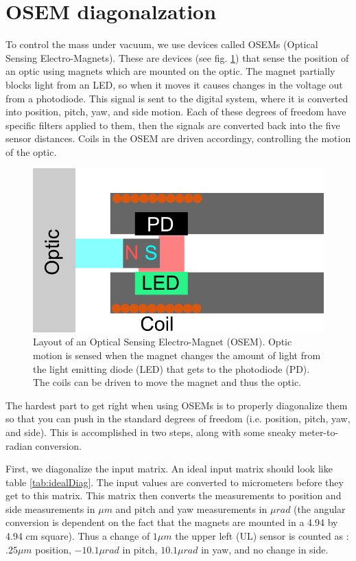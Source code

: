 \section{OSEM diagonalzation}

To control the mass under vacuum, we use devices called OSEMs (Optical Sensing Electro-Magnets). These are devices (see fig. \ref{fig:osem}) that sense the position of an optic using magnets which are mounted on the optic. The magnet partially blocks light from an LED, so when it moves it causes changes in the voltage out from a photodiode. This signal is sent to the digital system, where it is converted into position, pitch, yaw, and side motion. Each of these degrees of freedom have specific filters applied to them, then the signals are converted back into the five sensor distances. Coils in the OSEM are driven accordingy, controlling the motion of the optic.

\begin{figure}[hp]
	\centering
		\includegraphics[width=.5\textwidth]{figures/suspensions/OSEM.png}
	\caption[OSEM diagram]{Layout of an Optical Sensing Electro-Magnet (OSEM). Optic motion is sensed when the magnet changes the amount of light from the light emitting diode (LED) that gets to the photodiode (PD). The coils can be driven to move the magnet and thus the optic.}
	\label{fig:osem}
\end{figure}

The hardest part to get right when using OSEMs is to properly diagonalize them so that you can push in the standard degrees of freedom (i.e. position, pitch, yaw, and side). This is accomplished in two steps, along with some sneaky meter-to-radian conversion. 

First, we diagonalize the input matrix. An ideal input matrix should look like table \ref{tab:idealDiag}. The input values are converted to micrometers before they get to this matrix. This matrix then converts the measurements to position and side measurements in $\mu m$ and pitch and yaw measurements in $\mu rad$ (the angular conversion is dependent on the fact that the magnets are mounted in a 4.94 by 4.94 cm square). Thus a change of $1 \mu m$ the upper left (UL) sensor is counted as : $.25 \mu m$ position, $-10.1 \mu rad$ in pitch, $10.1 \mu rad$ in yaw, and no change in side.

